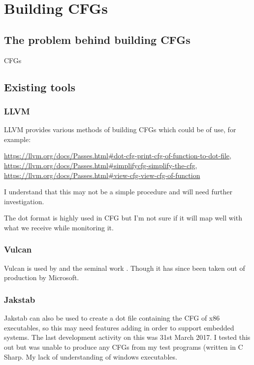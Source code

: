 \section{Building CFGs}

\subsection{The problem behind building CFGs}

CFGs 

\subsection{Existing tools}

\subsubsection{LLVM}

LLVM provides various methods of building CFGs which could be of use, for example:

\url{https://llvm.org/docs/Passes.html#dot-cfg-print-cfg-of-function-to-dot-file}, \url{https://llvm.org/docs/Passes.html#simplifycfg-simplify-the-cfg}, \url{https://llvm.org/docs/Passes.html#view-cfg-view-cfg-of-function}

I understand that this may not be a simple procedure and will need further investigation.

The dot format is highly used in CFG but I'm not sure if it will map well with what we receive while monitoring it.

\subsubsection{Vulcan}

Vulcan \cite{Edwards2001} is used by \cite{Davi2012} and the seminal work \cite{Abadi2005}. Though it has since been taken out of production by Microsoft.

\subsubsection{Jakstab}

Jakstab \cite{Kinder2008} can also be used to create a dot file containing the CFG of x86 executables, so this may need features adding in order to support embedded systems. The last development activity on this was 31st March 2017. I tested this out but was unable to produce any CFGs from my test programs (written in C Sharp. My lack of understanding of windows executables. 

